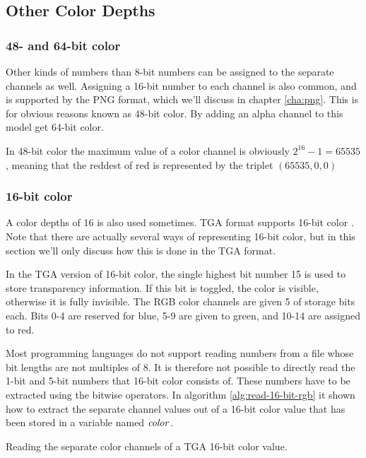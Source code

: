 \subsection{Other Color Depths}
\label{sec:other-channel-sizes}

\subsubsection{48- and 64-bit color}

Other kinds of numbers than 8-bit numbers can be assigned to the
separate channels as well. Assigning a 16-bit number to each channel
is also common, and is supported by the PNG
format\cite{boutel:_png_portab_networ_graph_specif_version12}, which
we'll discuss in chapter \ref{cha:png}. This is for obvious reasons
known as 48-bit color. By adding an alpha channel to this model get
64-bit color.

In 48-bit color the maximum value of a color channel is obviously
$2^{16} - 1 = 65535$, meaning that the reddest of red is represented
by the triplet $(65535, 0, 0)$

\subsubsection{16-bit color}

A color depths of 16 is also used sometimes. TGA format supports
16-bit color \cite{91:_truev_tga_file_format_specif}. Note that there
are actually several ways of representing 16-bit color, but in this
section we'll only discuss how this is done in the TGA format.

In the TGA version of 16-bit color, the single highest bit number 15
is used to store transparency information. If this bit is toggled, the
color is visible, otherwise it is fully invisible. The RGB color
channels are given 5 of storage bits each. Bits 0-4 are reserved for
blue, 5-9 are given to green, and 10-14 are assigned to red.

Most programming languages do not support reading numbers from a file
whose bit lengths are not multiples of 8. It is therefore not possible
to directly read the 1-bit and 5-bit numbers that 16-bit color
consists of. These numbers have to be extracted using the bitwise
operators. In algorithm \ref{alg:read-16-bit-rgb} it shown how to
extract the separate channel values out of a 16-bit color value that
has been stored in a variable named $\mathit{color}$.

\begin{algorithm}[H]
  \caption{Reading the separate color channels of a TGA 16-bit color
    value.}
  \label{alg:read-16-bit-rgb}
  \begin{algorithmic}[1]
  \end{algorithmic}
\end{algorithm}


